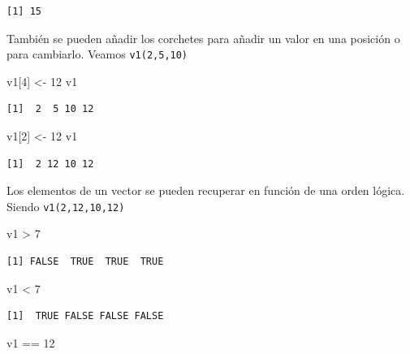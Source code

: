 \documentclass[
  letterpaper,
]{scrbook}
\newenvironment{Shaded}{\begin{snugshade}}{\end{snugshade}}
\newcommand{\DecValTok}[1]{\textcolor[rgb]{0.68,0.00,0.00}{#1}}
\newcommand{\NormalTok}[1]{\textcolor[rgb]{0.00,0.23,0.31}{#1}}
\newcommand{\OtherTok}[1]{\textcolor[rgb]{0.00,0.23,0.31}{#1}}
\newcommand{\SpecialCharTok}[1]{\textcolor[rgb]{0.37,0.37,0.37}{#1}}
\begin{document}
\begin{verbatim}
[1] 15
\end{verbatim}

También se pueden añadir los corchetes para añadir un valor en una
posición o para cambiarlo. Veamos \texttt{v1(2,5,10)}

\begin{Shaded}
\begin{Highlighting}[]
\NormalTok{v1[}\DecValTok{4}\NormalTok{] }\OtherTok{\textless{}{-}} \DecValTok{12}
\NormalTok{v1}
\end{Highlighting}
\end{Shaded}

\begin{verbatim}
[1]  2  5 10 12
\end{verbatim}

\begin{Shaded}
\begin{Highlighting}[]
\NormalTok{v1[}\DecValTok{2}\NormalTok{] }\OtherTok{\textless{}{-}} \DecValTok{12}
\NormalTok{v1}
\end{Highlighting}
\end{Shaded}

\begin{verbatim}
[1]  2 12 10 12
\end{verbatim}

Los elementos de un vector se pueden recuperar en función de una orden
lógica. Siendo \texttt{v1(2,12,10,12)}

\begin{Shaded}
\begin{Highlighting}[]
\NormalTok{v1 }\SpecialCharTok{\textgreater{}} \DecValTok{7}
\end{Highlighting}
\end{Shaded}

\begin{verbatim}
[1] FALSE  TRUE  TRUE  TRUE
\end{verbatim}

\begin{Shaded}
\begin{Highlighting}[]
\NormalTok{v1 }\SpecialCharTok{\textless{}} \DecValTok{7}
\end{Highlighting}
\end{Shaded}

\begin{verbatim}
[1]  TRUE FALSE FALSE FALSE
\end{verbatim}

\begin{Shaded}
\begin{Highlighting}[]
\NormalTok{v1 }\SpecialCharTok{==} \DecValTok{12}
\end{Highlighting}
\end{Shaded}
\end{document}

